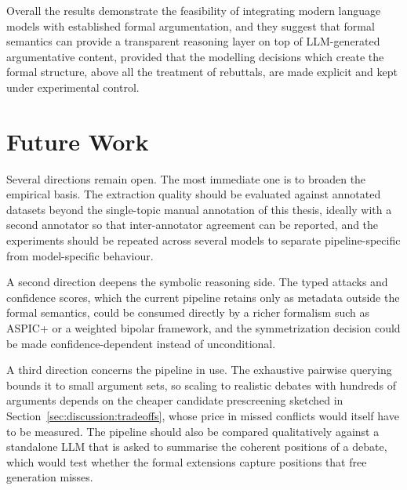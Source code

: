 Overall the results demonstrate the feasibility of integrating modern language
models with established formal argumentation, and they suggest that formal
semantics can provide a transparent reasoning layer on top of LLM-generated
argumentative content, provided that the modelling decisions which create the
formal structure, above all the treatment of rebuttals, are made explicit and
kept under experimental control.

\section{Future Work}
\label{sec:conclusion:future}

Several directions remain open. The most immediate one is to broaden the
empirical basis. The extraction quality should be evaluated against annotated
datasets beyond the single-topic manual annotation of this thesis, ideally
with a second annotator so that inter-annotator agreement can be reported, and
the experiments should be repeated across several models to separate
pipeline-specific from model-specific behaviour.

A second direction deepens the symbolic reasoning side. The typed attacks and confidence
scores, which the current pipeline retains only as metadata outside the formal
semantics, could be consumed directly by a richer formalism such as ASPIC+ or
a weighted bipolar framework, and the symmetrization decision could be made
confidence-dependent instead of unconditional.

A third direction concerns the pipeline in use. The exhaustive pairwise
querying bounds it to small argument sets, so scaling to realistic debates
with hundreds of arguments depends on the cheaper candidate prescreening
sketched in Section~\ref{sec:discussion:tradeoffs}, whose price in missed
conflicts would itself have to be measured. The pipeline should also be
compared qualitatively against a standalone LLM that is asked to summarise the
coherent positions of a debate, which would test whether the formal extensions
capture positions that free generation misses.
